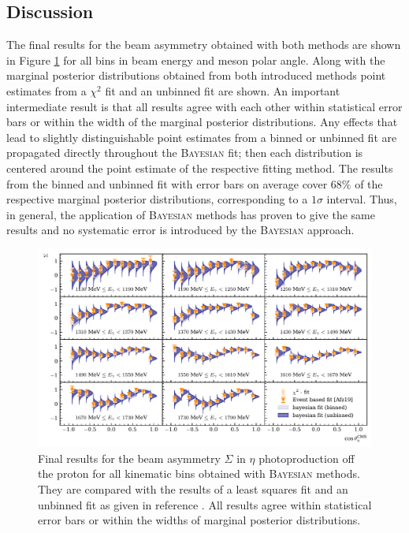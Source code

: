 \subsection{Discussion}
\label{sec:sigma_eta}
The final results for the beam asymmetry obtained with both methods are shown in Figure \ref{fig:eta_res} for all bins in beam energy and meson polar angle. Along with the marginal posterior distributions obtained from both introduced methods point estimates from a $\chi^2$ fit and an unbinned fit \cite{farahphd} are shown. An important intermediate result is that all results agree with each other within statistical error bars or within the width of the marginal posterior distributions. Any effects that lead to slightly distinguishable point estimates from a binned or unbinned fit are propagated directly throughout the \textsc{Bayesian} fit; then each distribution is centered around the point estimate of the respective fitting method. The results from the binned and unbinned fit with error bars on average cover $68\%$ of the respective marginal posterior distributions, corresponding to a $1\sigma$ interval. Thus, in general, the application of \textsc{Bayesian} methods has proven to give the same results and no systematic error is introduced by the \textsc{Bayesian} approach. 
	\begin{figure}
	\centering
	\includegraphics[width=\linewidth]{../bayes/event_based_fit/plots/sigma_eta.pdf}
	\caption{Final results for the beam asymmetry $\Sigma$ in $\eta$ photoproduction off the proton for all kinematic bins obtained with \textsc{Bayesian} methods. They are compared with the results of a least squares fit and an unbinned fit as given in reference \cite{farahphd}. All results agree within statistical error bars or within the widths of marginal posterior distributions.}
	\label{fig:eta_res}
\end{figure}
